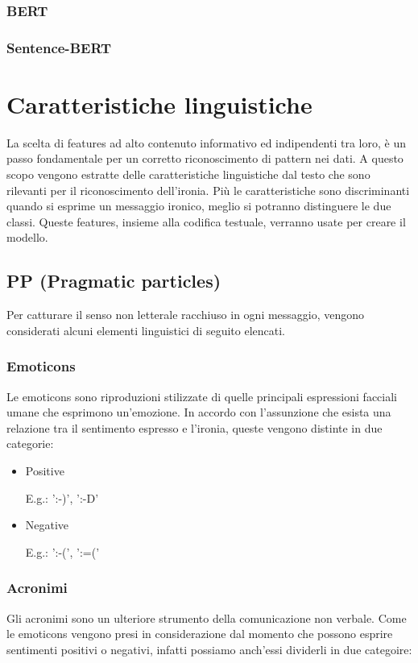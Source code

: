 \documentclass[oneside]{book}
\begin{document}
\subsubsection{BERT}

\subsubsection{Sentence-BERT}


\section{Caratteristiche linguistiche}
La scelta di features ad alto contenuto informativo ed indipendenti tra loro, è un passo fondamentale per un corretto riconoscimento di pattern nei dati.
A questo scopo vengono estratte delle caratteristiche linguistiche dal testo che sono rilevanti per il riconoscimento dell'ironia. Più le caratteristiche sono discriminanti quando si esprime un messaggio ironico, meglio si potranno distinguere le due classi. Queste features, insieme alla codifica testuale, verranno usate per creare il modello.

\subsection{PP (Pragmatic particles)}
Per catturare il senso non letterale racchiuso in ogni messaggio, vengono considerati alcuni elementi linguistici di seguito elencati.

\subsubsection{Emoticons}
Le emoticons sono riproduzioni stilizzate di quelle principali espressioni facciali umane che esprimono un'emozione. In accordo con l'assunzione che esista una relazione tra il sentimento espresso e l'ironia, queste vengono distinte in due categorie:
\begin{itemize}
	\item
	Positive
	
	E.g.: ':-)', ':-D'
	\item
	Negative
	
	E.g.: ':-(', ':=('
	
\end{itemize}

\subsubsection{Acronimi}
Gli acronimi sono un ulteriore strumento della comunicazione non verbale. Come le emoticons vengono presi in considerazione dal momento che possono esprire sentimenti positivi o negativi, infatti possiamo anch'essi dividerli in due categoire:
\end{document}
